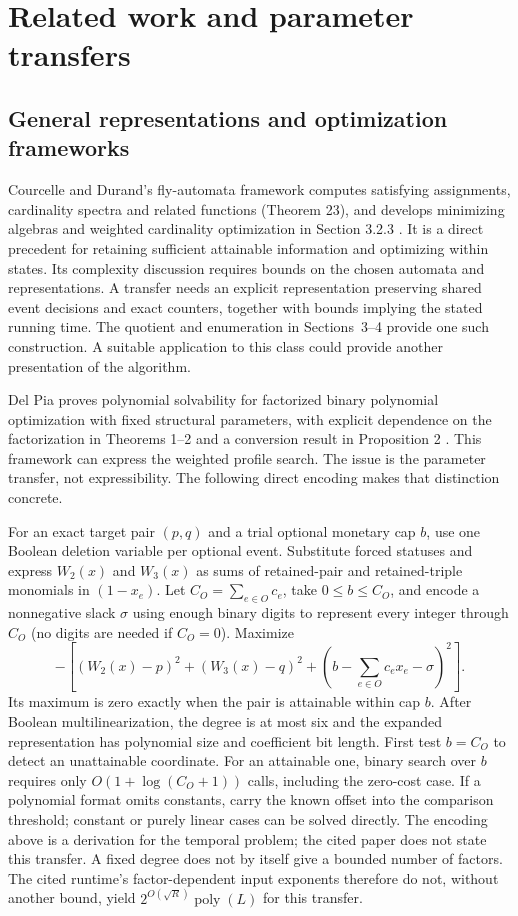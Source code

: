 \documentclass[11pt]{article}
\theoremstyle{remark}
\newcommand{\poly}{\operatorname{poly}}
\begin{document}
\section{Related work and parameter transfers}\label{sec:prior}


\subsection{General representations and optimization frameworks}
Courcelle and Durand's fly-automata framework computes satisfying assignments,
cardinality spectra and related functions (Theorem 23), and develops minimizing
algebras and weighted cardinality optimization in Section 3.2.3
\citep{courcelle2016}. It is a direct precedent for retaining sufficient
attainable information and optimizing within states. Its complexity discussion
requires bounds on the chosen automata and representations. A transfer needs
an explicit representation preserving shared event decisions and exact
counters, together with bounds implying the stated running time. The quotient and enumeration in Sections~3--4 provide one such construction. A suitable application to
this class could provide another presentation of the algorithm.

Del Pia proves polynomial solvability for factorized binary polynomial
optimization with fixed structural parameters, with explicit dependence on
the factorization in Theorems 1--2 and a conversion result in Proposition 2
\citep{delpia2026}. This framework can express the weighted profile search.
The issue is the parameter transfer, not expressibility. The following direct
encoding makes that distinction concrete.

For an exact target pair $(p,q)$ and a trial optional monetary cap $b$, use
one Boolean deletion variable per optional event. Substitute forced statuses
and express $W_2(x)$ and $W_3(x)$ as sums of retained-pair and retained-triple
monomials in $(1-x_e)$. Let $C_O=\sum_{e\in O}c_e$, take $0\le b\le C_O$, and
encode a nonnegative slack $\sigma$ using enough binary digits to represent
every integer through $C_O$ (no digits are needed if $C_O=0$). Maximize
\begin{equation}
 -\left[(W_2(x)-p)^2+(W_3(x)-q)^2+
      \left(b-\sum_{e\in O}c_ex_e-\sigma\right)^2\right].
 \label{eq:penalty}
\end{equation}
Its maximum is zero exactly when the pair is attainable within cap $b$.
After Boolean multilinearization, the degree is at most six and the expanded
representation has polynomial size and coefficient bit length. First test
$b=C_O$ to detect an unattainable coordinate. For an attainable one, binary
search over $b$ requires only $O(1+\log(C_O+1))$ calls, including the zero-cost
case. If a polynomial format omits constants, carry the known offset into
the comparison threshold; constant or purely linear cases can be solved
directly. The encoding above is a derivation for the temporal problem;
the cited paper does not state this transfer. A fixed degree
does not by itself give a bounded number of factors. The cited runtime's
factor-dependent input exponents therefore do not, without another bound,
yield $2^{O(\sqrt R)}\poly(L)$ for this transfer.
\end{document}
